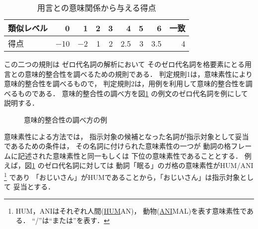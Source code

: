 \vspace{0.5cm}

\begin{table}[t]
     \caption{用言との意味関係から与える得点}
    \label{tab:yourei_ruijido}

  \begin{center}
\begin{tabular}[c]{|l|r|r|r|r|r|r|r|r|}\hline
類似レベル & 0 & 1 & 2 & 3 & 4 & 5 & 6 & 一致\\\hline
得点   & $-$10 & $-$2 & 1 & 2 & 2.5& 3 & 3.5 & 4\\\hline
\end{tabular}
\vspace{-0.8mm}
\end{center}
\end{table}
\clearpage

この二つの規則は
ゼロ代名詞の解析において
そのゼロ代名詞を格要素にとる用言との意味的整合性を調べるための規則である．
判定規則1は，意味素性により意味的整合性を調べるもので，
判定規則2は，用例を利用して意味的整合性を調べるものである．
意味的整合性の調べ方を図\ref{fig:datousei_hantei_rei}
の例文のゼロ代名詞を例にして説明する．
\begin{figure}[t]
  \begin{center}
    \caption{意味的整合性の調べ方の例}
    \label{fig:datousei_hantei_rei}
  \end{center}
\end{figure}
意味素性による方法では，
指示対象の候補となった名詞が指示対象として妥当であるための条件は，
その名詞に付けられた意味素性の一つが
動詞の格フレームに記述された意味素性と同一もしくは
下位の意味素性であることとする．
例えば，図\ref{fig:datousei_hantei_rei} のゼロ代名詞に対しては
動詞「眠る」のガ格の意味素性がHUM/ANI
\footnote{
HUM，ANIはそれぞれ人間(\underline{HUM}AN)，
動物(\underline{ANI}MAL)を表す意味素性である．
``/''は``または''を表す．
}
であり
「おじいさん」がHUMであることから，「おじいさん」は指示対象として
妥当とする．

